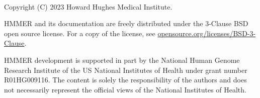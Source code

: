 \newpage
\begin{fullwidth}
  ~\vfill
  \thispagestyle{empty}
  \setlength{\parindent}{0pt}
  \setlength{\parskip}{\baselineskip}

\par
Copyright (C) 2023 Howard Hughes Medical Institute.

\par
HMMER and its documentation are freely distributed
under the 3-Clause BSD open source license. For a copy of the license,
see \href{https://opensource.org/licenses/BSD-3-Clause}{opensource.org/licenses/BSD-3-Clause}.

\par
HMMER development is supported in part by the National Human
Genome Research Institute of the US National Institutes of Health under
grant number R01HG009116. The content is solely the responsibility
of the authors and does not necessarily represent the official views of
the National Institutes of Health.

\end{fullwidth}




